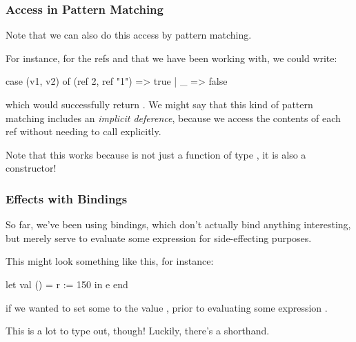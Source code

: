 \documentclass[aspectratio=169]{beamer}
\begin{document}
\begin{frame}[fragile]
  \frametitle{ Access in Pattern Matching}

  Note that we can also do this \code{!} access by pattern matching.

  \pause
  \vspace{\fill}

  For instance, for the refs  and 
  that we have been working with, we could write:
  \begin{codeblock}
    case (v1, v2) of
      (ref 2, ref "1") => true
    | _ => false
  \end{codeblock}
  which would successfully return . We might say that this kind
  of pattern matching includes an \textit{implicit deference}, because we
  access the contents of each ref without needing to call \code{!} explicitly.

  \pause
  \vspace{\fill}

  Note that this works because  is not just a function of type
  , it is also a constructor!
\end{frame}

\begin{frame}[fragile]
  \frametitle{Effects with Bindings}

  So far, we've been using  bindings, which don't actually bind
  anything interesting, but merely serve to evaluate some expression for
  side-effecting purposes.

  \pause
  \vspace{\fill}

  This might look something like this, for instance:
  \begin{codeblock}
    let
      val () = r := 150
    in
      e
    end
  \end{codeblock}

  if we wanted to set some  to the value , prior to
  evaluating some expression .

  \pause
  \vspace{\fill}

  This is a lot to type out, though! Luckily, there's a shorthand.

\end{frame}
\end{document}
